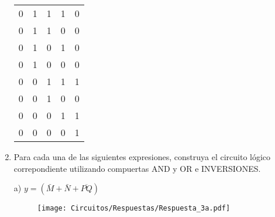 \documentclass[a4paper, 12pt]{article}
\newcommand{\Aspace}{0.2cm}
\begin{document}
\begin{enumerate}
{\begin{tabular}{c|c|c|c|c}
                    0           &   1           &   1           &   1           &   0                                                                           \\
                    0           &   1           &   1           &   0           &   0                                                                           \\
                    0           &   1           &   0           &   1           &   0                                                                           \\
                    0           &   1           &   0           &   0           &   0                                                                           \\
                    0           &   0           &   1           &   1           &   1                                                                           \\
                    0           &   0           &   1           &   0           &   0                                                                           \\
                    0           &   0           &   0           &   1           &   1                                                                           \\
                    0           &   0           &   0           &   0           &   1                                                                           \\
                \end{tabular} 
            }



        \item Para cada una de las siguientes expresiones, construya el circuito lógico correpondiente utilizando compuertas AND y OR e INVERSIONES.
            \vspace{\Aspace} \par
            a) $y = (\bar{M} + \bar{N} + \overline{PQ})$
            \\ { \color{azul} 
                \begin{figure}[!ht]
                    \centering
                    \texttt{[image: Circuitos/Respuestas/Respuesta\_3a.pdf]}
                \end{figure}
            }


\end{enumerate}
\end{document}
